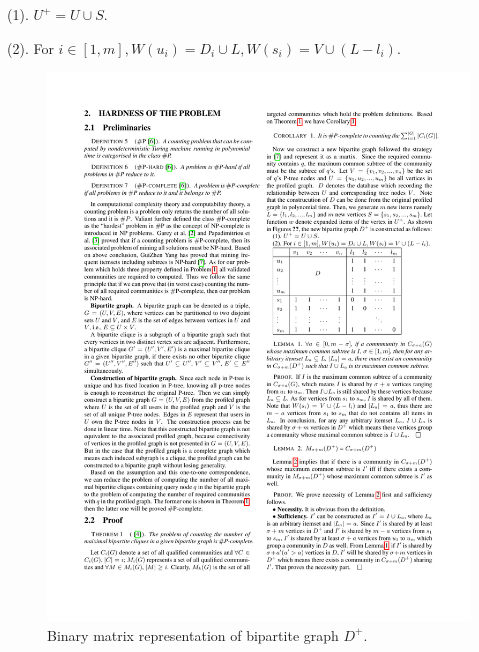(1). $U^+=U \cup S$. 

(2). For $i\in [1,m], W(u_i)=D_i \cup L, W(s_i)=V \cup (L-{l_i})$. 

\begin{figure}
	\centering
	\includegraphics[width=0.88\linewidth]{Figures/ExpandMatrix}
	\caption{Binary matrix representation of bipartite graph $D^+$.}
	\label{fig:newMatrix}
\end{figure} 

